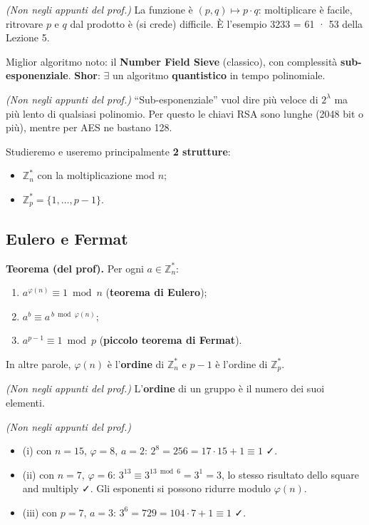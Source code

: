 \emph{(Non negli appunti del prof.)} La funzione è \((p, q) \mapsto p \cdot q\): moltiplicare è facile, ritrovare \(p\) e \(q\) dal prodotto è (si crede) difficile. È l'esempio 3233 = 61 · 53 della Lezione 5.

Miglior algoritmo noto: il \textbf{Number Field Sieve} (classico), con complessità \textbf{sub-esponenziale}. \textbf{Shor}: \(\exists\) un algoritmo \textbf{quantistico} in tempo polinomiale.

\emph{(Non negli appunti del prof.)} ``Sub-esponenziale'' vuol dire più veloce di \(2^\lambda\) ma più lento di qualsiasi polinomio. Per questo le chiavi RSA sono lunghe (2048 bit o più), mentre per AES ne bastano 128.

Studieremo e useremo principalmente \textbf{2 strutture}:
\begin{itemize}
  \item \(\mathbb{Z}_n^*\) con la moltiplicazione mod \(n\);
  \item \(\mathbb{Z}_p^* = \{1, \dots, p-1\}\).
\end{itemize}

\subsection{Eulero e Fermat}

\textbf{Teorema (del prof).} Per ogni \(a \in \mathbb{Z}_n^*\):
\begin{enumerate}
  \item[(i)] \(a^{\varphi(n)} \equiv 1 \bmod n\) \quad (\textbf{teorema di Eulero});
  \item[(ii)] \(a^b \equiv a^{\,b \bmod \varphi(n)}\);
  \item[(iii)] \(a^{p-1} \equiv 1 \bmod p\) \quad (\textbf{piccolo teorema di Fermat}).
\end{enumerate}

In altre parole, \(\varphi(n)\) è l'\textbf{ordine} di \(\mathbb{Z}_n^*\) e \(p - 1\) è l'ordine di \(\mathbb{Z}_p^*\).

\emph{(Non negli appunti del prof.)} L'\textbf{ordine} di un gruppo è il numero dei suoi elementi.

\begin{esempio}
\emph{(Non negli appunti del prof.)}
\begin{itemize}
  \item (i) con \(n = 15\), \(\varphi = 8\), \(a = 2\): \(2^8 = 256 = 17 \cdot 15 + 1 \equiv 1\) ✓.
  \item (ii) con \(n = 7\), \(\varphi = 6\): \(3^{13} \equiv 3^{13 \bmod 6} = 3^1 = 3\), lo stesso risultato dello square and multiply ✓. Gli esponenti si possono ridurre modulo \(\varphi(n)\).
  \item (iii) con \(p = 7\), \(a = 3\): \(3^6 = 729 = 104 \cdot 7 + 1 \equiv 1\) ✓.
\end{itemize}
\end{esempio}

